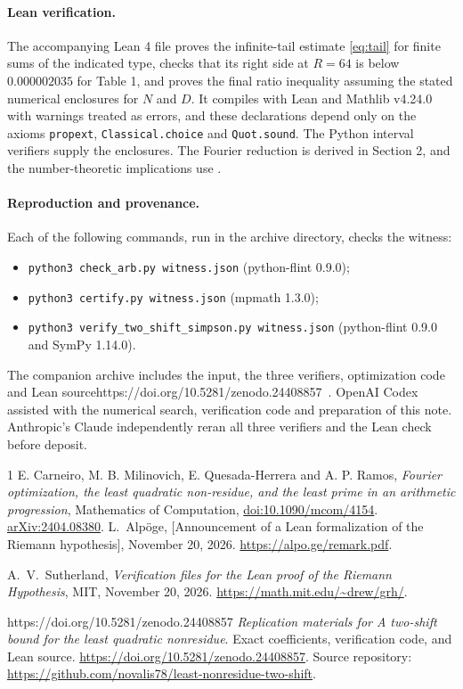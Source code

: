 \documentclass[11pt]{article}
\newcommand*{\replicationURL}{https://doi.org/10.5281/zenodo.24408857}
\newcommand*{\ifReplicationURL}[1]{\ifx\replicationURL\empty\else#1\fi}
\begin{document}
\paragraph{Lean verification.}
The accompanying Lean 4 file proves the infinite-tail estimate
\eqref{eq:tail} for finite sums of the indicated type, checks that its right side at $R=64$
is below $0.000002035$ for Table 1, and proves the final
ratio inequality assuming the stated numerical enclosures for $N$ and $D$.
It compiles with Lean and Mathlib v4.24.0 with warnings treated as errors,
and these declarations depend only on the axioms \texttt{propext},
\texttt{Classical.choice} and \texttt{Quot.sound}.
The Python interval verifiers supply the enclosures. The Fourier reduction
is derived in Section 2, and the number-theoretic implications use
\cite{cmqr}.

\paragraph{Reproduction and provenance.}
Each of the following commands, run in the archive directory, checks the witness:
\begin{itemize}
\item \texttt{python3 check\_arb.py witness.json} (python-flint 0.9.0);
\item \texttt{python3 certify.py witness.json} (mpmath 1.3.0);
\item \texttt{python3 verify\_two\_shift\_simpson.py witness.json}\newline
      (python-flint 0.9.0 and SymPy 1.14.0).
\end{itemize}
The companion archive includes the input, the three verifiers, optimization
code and Lean source\ifReplicationURL{~\cite{replication}}. OpenAI Codex assisted with the numerical search,
verification code and preparation of this note. Anthropic's Claude
independently reran all three verifiers and the Lean check before deposit.

\begin{thebibliography}{1}
 E. Carneiro, M. B. Milinovich, E. Quesada-Herrera and
A. P. Ramos, \emph{Fourier optimization, the least quadratic non-residue,
and the least prime in an arithmetic progression}, Mathematics of
Computation, \href{https://doi.org/10.1090/mcom/4154}{doi:10.1090/mcom/4154}.
\href{https://arxiv.org/abs/2404.08380}{arXiv:2404.08380}.
 L.~Alp\"oge, [Announcement of a Lean formalization of the
Riemann hypothesis], November 20, 2026.
\url{https://alpo.ge/remark.pdf}.

 A.~V.~Sutherland, \emph{Verification files for the
Lean proof of the Riemann Hypothesis}, MIT, November 20, 2026.
\url{https://math.mit.edu/~drew/grh/}.

\ifReplicationURL{ \emph{Replication materials for A
two-shift bound for the least quadratic nonresidue}. Exact coefficients,
verification code, and Lean source.
\expandafter\url\expandafter{\replicationURL}. Source repository:
\url{https://github.com/novalis78/least-nonresidue-two-shift}.}
\end{thebibliography}
\end{document}

